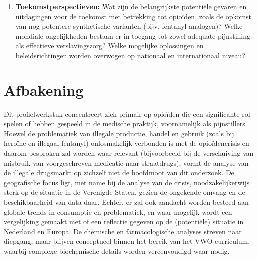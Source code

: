 \documentclass[11pt, a4paper]{report} %
\begin{document}
\begin{enumerate}
    \item \textbf{Toekomstperspectieven:} Wat zijn de belangrijkste potentiële gevaren en uitdagingen voor de toekomst met betrekking tot opioïden, zoals de opkomst van nog potentere synthetische varianten (bijv. fentanyl-analogen)? Welke mondiale ongelijkheden bestaan er in toegang tot zowel adequate pijnstilling als effectieve verslavingszorg? Welke mogelijke oplossingen en beleidsrichtingen worden overwogen op nationaal en internationaal niveau?
\end{enumerate}

\section{Afbakening}
Dit profielwerkstuk concentreert zich primair op opioïden die een significante rol spelen of hebben gespeeld in de medische praktijk, voornamelijk als pijnstillers. Hoewel de problematiek van illegale productie, handel en gebruik (zoals bij heroïne en illegaal fentanyl) onlosmakelijk verbonden is met de opioïdencrisis en daarom besproken zal worden waar relevant (bijvoorbeeld bij de verschuiving van misbruik van voorgeschreven medicatie naar straatdrugs), vormt de analyse van de illegale drugsmarkt op zichzelf niet de hoofdmoot van dit onderzoek. De geografische focus ligt, met name bij de analyse van de crisis, noodzakelijkerwijs sterk op de situatie in de Verenigde Staten, gezien de ongekende omvang en de beschikbaarheid van data daar. Echter, er zal ook aandacht worden besteed aan globale trends in consumptie en problematiek, en waar mogelijk wordt een vergelijking gemaakt met of een reflectie gegeven op de (potentiële) situatie in Nederland en Europa. De chemische en farmacologische analyses streven naar diepgang, maar blijven conceptueel binnen het bereik van het VWO-curriculum, waarbij complexe biochemische details worden vereenvoudigd waar nodig.
\end{document}
